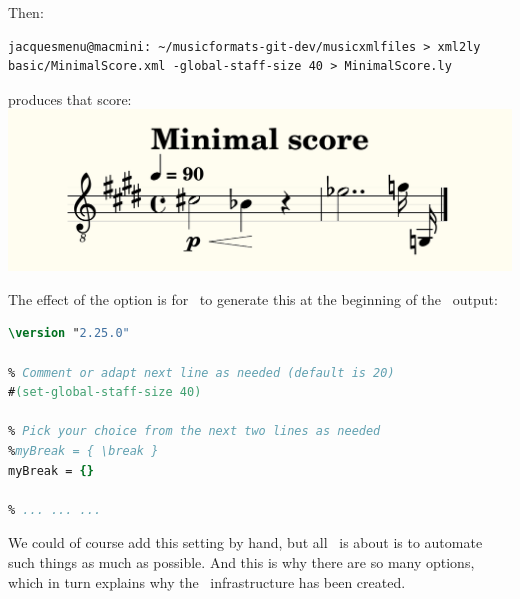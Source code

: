 Then:
\begin{lstlisting}[language=Terminal]
jacquesmenu@macmini: ~/musicformats-git-dev/musicxmlfiles > xml2ly basic/MinimalScore.xml -global-staff-size 40 > MinimalScore.ly
\end{lstlisting}

produces that score:\\
\includegraphics[scale=0.7]{../mfgraphics/mfgraphicsMinimalScoreEnlarged.png}

The effect of the  option is for \xmlToLy\ to generate this at the beginning of the \lily\ output:
\begin{lstlisting}[language=Lilypond]
\version "2.25.0"

% Comment or adapt next line as needed (default is 20)
#(set-global-staff-size 40)

% Pick your choice from the next two lines as needed
%myBreak = { \break }
myBreak = {}

% ... ... ...
\end{lstlisting}

We could of course add this  setting by hand, but all \mf\ is about is to automate such things as much as possible. And this is why there are so many options, which in turn explains why the \oahRepr\ infrastructure has been created.

